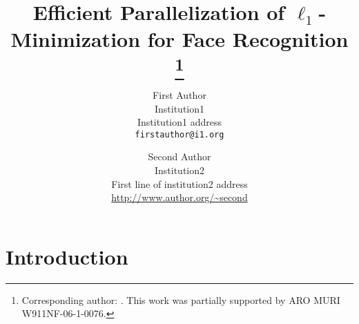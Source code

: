 \documentclass[10pt,twocolumn,letterpaper]{article}
\begin{document}
\title{Efficient Parallelization of $\ell_1$-Minimization for Face Recognition
\thanks{Corresponding author: . This work was partially supported by ARO MURI W911NF-06-1-0076.}}

\author{First Author\\
Institution1\\
Institution1 address\\
{\tt\small firstauthor@i1.org}
\and
Second Author\\
Institution2\\
First line of institution2 address\\
{\small\url{http://www.author.org/~second}}
}

\maketitle

\begin{abstract}

\end{abstract}

\section{Introduction} 
\end{document}
